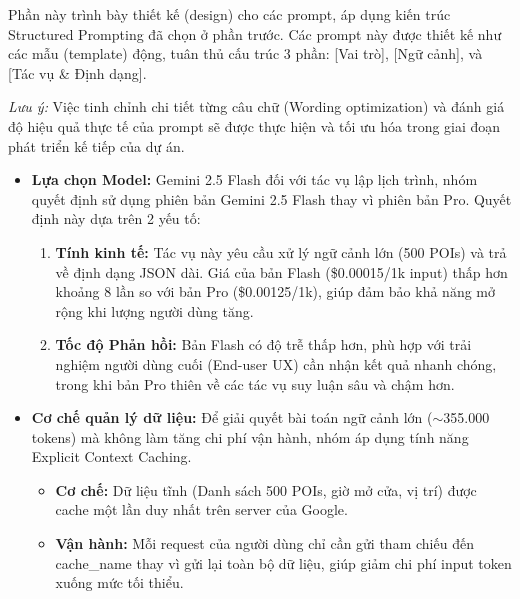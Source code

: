 
Phần này trình bày thiết kế (design) cho các prompt, áp dụng kiến trúc Structured Prompting đã chọn ở phần trước. Các prompt này được thiết kế như các mẫu (template) động, tuân thủ cấu trúc 3 phần: [Vai trò], [Ngữ cảnh], và [Tác vụ \& Định dạng].

\textit{Lưu ý:} Việc tinh chỉnh chi tiết từng câu chữ (Wording optimization) và đánh giá độ hiệu quả thực tế của prompt sẽ được thực hiện và tối ưu hóa trong giai đoạn phát triển kế tiếp của dự án.


\begin{itemize}
    \item \textbf{Lựa chọn Model:} Gemini 2.5 Flash đối với tác vụ lập lịch trình, nhóm quyết định sử dụng phiên bản Gemini 2.5 Flash thay vì phiên bản Pro. Quyết định này dựa trên 2 yếu tố:

    \begin{enumerate}[label=\arabic*., leftmargin=*]
        \item \textbf{Tính kinh tế:} Tác vụ này yêu cầu xử lý ngữ cảnh lớn (500 POIs) và trả về định dạng JSON dài. Giá của bản Flash (\$0.00015/1k input) thấp hơn khoảng 8 lần so với bản Pro (\$0.00125/1k), giúp đảm bảo khả năng mở rộng khi lượng người dùng tăng.
        \item \textbf{Tốc độ Phản hồi:} Bản Flash có độ trễ thấp hơn, phù hợp với trải nghiệm người dùng cuối (End-user UX) cần nhận kết quả nhanh chóng, trong khi bản Pro thiên về các tác vụ suy luận sâu và chậm hơn.
    \end{enumerate}

    \item \textbf{Cơ chế quản lý dữ liệu:} Để giải quyết bài toán ngữ cảnh lớn ($\sim$355.000 tokens) mà không làm tăng chi phí vận hành, nhóm áp dụng tính năng Explicit Context Caching.
    \begin{itemize}
        \item \textbf{Cơ chế:} Dữ liệu tĩnh (Danh sách 500 POIs, giờ mở cửa, vị trí) được cache một lần duy nhất trên server của Google.
        \item \textbf{Vận hành:} Mỗi request của người dùng chỉ cần gửi tham chiếu đến cache\_name thay vì gửi lại toàn bộ dữ liệu, giúp giảm chi phí input token xuống mức tối thiểu.
    \end{itemize}


\end{itemize}
